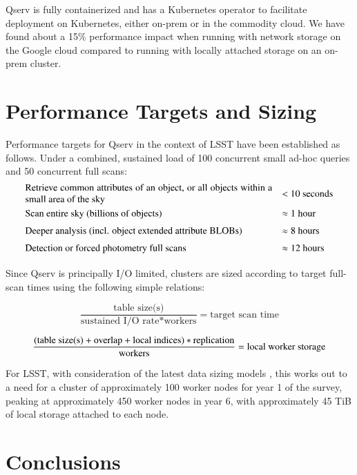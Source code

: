 \documentclass[11pt,twoside]{article}
\begin{document}
Qserv is fully containerized and has a Kubernetes operator to facilitate deployment on Kubernetes, either
on-prem or in the commodity cloud.  We have found about a 15\% performance impact when running with network
storage on the Google cloud compared to running with locally attached storage on an on-prem cluster.

\section{Performance Targets and Sizing}

Performance targets for Qserv in the context of LSST have been established as follows.  Under a combined,
sustained load of 100 concurrent small ad-hoc queries and 50 concurrent full scans:
\[
{\renewcommand{\arraystretch}{1.5}\begin{array}{ll}
  \parbox{9cm}{Retrieve common attributes of an object, or all objects within a small area of the sky}
    & \mbox{< 10 seconds} \\
  \mbox{Scan entire sky (billions of objects)}
    & \mbox{$\approx{}$1 hour} \\
  \mbox{Deeper analysis (incl. object extended attribute BLOBs)}
    & \mbox{$\approx{}$8 hours} \\
  \mbox{Detection or forced photometry full scans}
    & \mbox{$\approx{}$12 hours} \\
\end{array}}
\]

Since Qserv is principally I/O limited, clusters are sized according to target full-scan times using the
following simple relations:

\[
    \frac{\text{table size(s)}}{\text{sustained I/O rate} * \text{workers}} = \text{target scan time}
\]

\[
    \frac{(\text{table size(s)} + \text{overlap} + \text{local indices}) * \text{replication}}
    {\text{workers}} = \text{local worker storage} \\
\]

For LSST, with consideration of the latest data sizing models \citep{DMTN-135}, this works out to a need for a
cluster of approximately 100 worker nodes for year 1 of the survey, peaking at approximately 450 worker nodes
in year 6, with approximately 45 TiB of local storage attached to each node.

\section{Conclusions}
\end{document}
